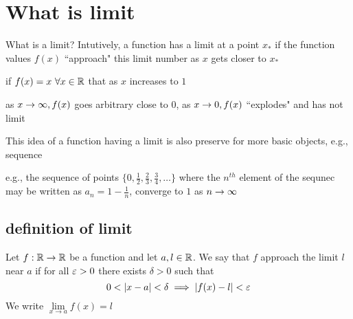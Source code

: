 \section{What is limit}

What is a limit? Intutively, a function has a limit at a point $x_*$ if the function values $f(x)$ ``approach" this limit number as $x$ gets closer to $x_*$

\begin{center}

if $f(x) = x\ \forall x \in \mathbb R$ that as $x$ increases to $1$
\end{center}

\begin{center}

as $x \rightarrow \infty, f(x)$ goes arbitrary close to $0$, as $x \rightarrow 0, f(x)$ ``explodes" and has not limit
\end{center}

This idea of a function having a limit is also preserve for more basic objects, e.g., sequence

e.g., the sequence of points $\{0, \frac{1}{2}, \frac{2}{3}, \frac{3}{4}, \dotsc\}$ where the $n^{th}$ element of the sequnec may be written as $a_n=1-\frac{1}{n}$, converge to $1$ as $n \rightarrow \infty$

\subsection{definition of limit}

\begin{definition}\label{def:limit}
    Let $f: \mathbb R \rightarrow \mathbb R$ be a function and let $a, l \in \mathbb R$.
    We say that $f$ approach the limit $l$ near $a$ if for all $\varepsilon > 0$ there exists $\delta > 0$ such that
    $$0 < |x-a| < \delta \implies |f(x)-l| < \varepsilon$$
    We write $\lim\limits_{x \to a} f(x) = l$
\end{definition}

